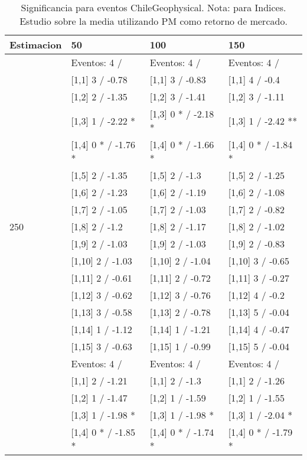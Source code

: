 \begin{table}

\caption{Significancia para eventos ChileGeophysical. Nota: para Indices. Estudio sobre la media utilizando PM como retorno de mercado.}
\centering
\begin{tabular}[t]{llll}
\toprule
Estimacion & 50 & 100 & 150\\
\midrule
 & Eventos:  4 / & Eventos:  4 / & Eventos:  4 /\\
 & {}[1,1] 3  / -0.78 & {}[1,1] 3  / -0.83 & {}[1,1] 4  / -0.4\\
 & {}[1,2] 2  / -1.35 & {}[1,2] 3  / -1.41 & {}[1,2] 3  / -1.11\\
 & {}[1,3] 1  / -2.22 * & {}[1,3] 0 * / -2.18 * & {}[1,3] 1  / -2.42 **\\
 & {}[1,4] 0 * / -1.76 * & {}[1,4] 0 * / -1.66 * & {}[1,4] 0 * / -1.84 *\\
\addlinespace
 & {}[1,5] 2  / -1.35 & {}[1,5] 2  / -1.3 & {}[1,5] 2  / -1.25\\
 & {}[1,6] 2  / -1.23 & {}[1,6] 2  / -1.19 & {}[1,6] 2  / -1.08\\
 & {}[1,7] 2  / -1.05 & {}[1,7] 2  / -1.03 & {}[1,7] 2  / -0.82\\
250 & {}[1,8] 2  / -1.2 & {}[1,8] 2  / -1.17 & {}[1,8] 2  / -1.02\\
 & {}[1,9] 2  / -1.03 & {}[1,9] 2  / -1.03 & {}[1,9] 2  / -0.83\\
\addlinespace
 & {}[1,10] 2  / -1.03 & {}[1,10] 2  / -1.04 & {}[1,10] 3  / -0.65\\
 & {}[1,11] 2  / -0.61 & {}[1,11] 2  / -0.72 & {}[1,11] 3  / -0.27\\
 & {}[1,12] 3  / -0.62 & {}[1,12] 3  / -0.76 & {}[1,12] 4  / -0.2\\
 & {}[1,13] 3  / -0.58 & {}[1,13] 2  / -0.78 & {}[1,13] 5  / -0.04\\
 & {}[1,14] 1  / -1.12 & {}[1,14] 1  / -1.21 & {}[1,14] 4  / -0.47\\
\addlinespace
 & {}[1,15] 3  / -0.63 & {}[1,15] 1  / -0.99 & {}[1,15] 5  / -0.04\\
 & Eventos:  4 / & Eventos:  4 / & Eventos:  4 /\\
 & {}[1,1] 2  / -1.21 & {}[1,1] 2  / -1.3 & {}[1,1] 2  / -1.26\\
 & {}[1,2] 1  / -1.47 & {}[1,2] 1  / -1.59 & {}[1,2] 1  / -1.55\\
 & {}[1,3] 1  / -1.98 * & {}[1,3] 1  / -1.98 * & {}[1,3] 1  / -2.04 *\\
\addlinespace
 & {}[1,4] 0 * / -1.85 * & {}[1,4] 0 * / -1.74 * & {}[1,4] 0 * / -1.79 *\\

\end{tabular}
\end{table}
